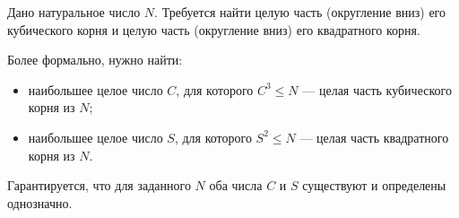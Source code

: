 Дано натуральное число $N$. Требуется найти целую часть (округление вниз) его кубического корня и целую часть (округление вниз) его квадратного корня.

Более формально, нужно найти:

\begin{itemize}
\item наибольшее целое число $C$, для которого $C^3 \le N$ --- целая часть кубического корня из $N$;
\item наибольшее целое число $S$, для которого $S^2 \le N$ --- целая часть квадратного корня из $N$.
\end{itemize}

Гарантируется, что для заданного $N$ оба числа $C$ и $S$ существуют и определены однозначно.
